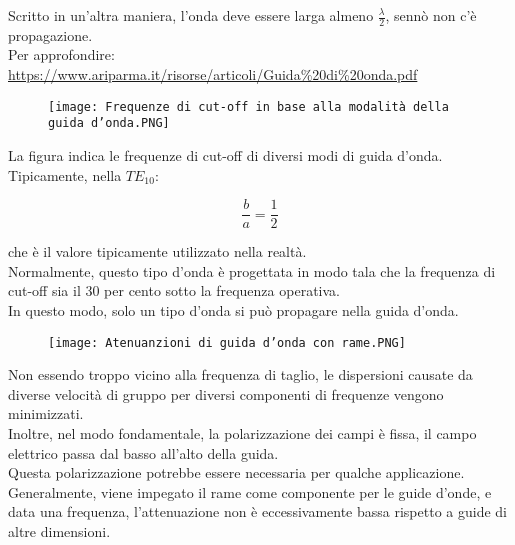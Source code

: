 \begin{tcolorbox}
    Scritto in un'altra maniera, l'onda deve essere larga almeno $\frac{\lambda}{2}$, 
    sennò non c'è propagazione. \\
    Per approfondire: \\ 
    \url{https://www.ariparma.it/risorse/articoli/Guida%20di%20onda.pdf} 
        
\end{tcolorbox}

\begin{figure}[h]
    \centering
    \texttt{[image: Frequenze di cut-off in base alla modalità della guida d'onda.PNG]}
\end{figure}  


La figura indica le frequenze di cut-off di diversi modi di guida d'onda. \\ 
Tipicamente, nella $TE_{10}$: 

{
    \Large
    \begin{equation}
        \frac{b}{a} = \frac{1}{2}
    \end{equation}
}

che è il valore tipicamente utilizzato nella realtà. \\ 
Normalmente, questo tipo d'onda è progettata in modo tala che la frequenza di cut-off sia il 30 per cento sotto la frequenza operativa. \\ 
In questo modo, solo un tipo d'onda si può propagare nella guida d'onda. \\ 

\begin{figure}[h]
    \centering
    \texttt{[image: Atenuanzioni di guida d'onda con rame.PNG]}
\end{figure}  



Non essendo troppo vicino alla frequenza di taglio, 
le dispersioni causate da diverse velocità di gruppo per diversi componenti di frequenze vengono minimizzati.  \\ 

Inoltre, nel modo fondamentale, la polarizzazione dei campi è fissa, 
il campo elettrico passa dal basso all'alto della guida. \\
Questa polarizzazione potrebbe essere necessaria per qualche applicazione. \\

Generalmente, viene impegato il rame come componente per le guide d'onde, e data una frequenza, l'attenuazione non è eccessivamente bassa 
rispetto a guide di altre dimensioni. \\

